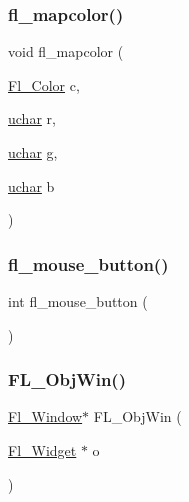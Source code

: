 \mbox{\label{forms_8_h_a6945fcbddb4cb709089b8a7478451f61}} 
\subsubsection{\texorpdfstring{fl\+\_\+mapcolor()}{fl\_mapcolor()}}
{\footnotesize\ttfamily void fl\+\_\+mapcolor (\begin{DoxyParamCaption}\item[{\hyperlink{_enumerations_8_h_a8b762953646f8abee866061f1af78a6a}{Fl\+\_\+\+Color}}]{c,  }\item[{\hyperlink{fl__types_8h_a65f85814a8290f9797005d3b28e7e5fc}{uchar}}]{r,  }\item[{\hyperlink{fl__types_8h_a65f85814a8290f9797005d3b28e7e5fc}{uchar}}]{g,  }\item[{\hyperlink{fl__types_8h_a65f85814a8290f9797005d3b28e7e5fc}{uchar}}]{b }\end{DoxyParamCaption})\hspace{0.3cm}{\ttfamily [inline]}}

\mbox{\label{forms_8_h_af246c9c93ccb649c375c1796fc7c0d8c}} 
\subsubsection{\texorpdfstring{fl\+\_\+mouse\+\_\+button()}{fl\_mouse\_button()}}
{\footnotesize\ttfamily int fl\+\_\+mouse\+\_\+button (\begin{DoxyParamCaption}{ }\end{DoxyParamCaption})\hspace{0.3cm}{\ttfamily [inline]}}

\mbox{\label{forms_8_h_af0e3f03c47997444eb52156afb81faad}} 
\subsubsection{\texorpdfstring{F\+L\+\_\+\+Obj\+Win()}{FL\_ObjWin()}}
{\footnotesize\ttfamily \hyperlink{class_fl___window}{Fl\+\_\+\+Window}$\ast$ F\+L\+\_\+\+Obj\+Win (\begin{DoxyParamCaption}\item[{\hyperlink{class_fl___widget}{Fl\+\_\+\+Widget} $\ast$}]{o }\end{DoxyParamCaption})\hspace{0.3cm}{\ttfamily [inline]}}

